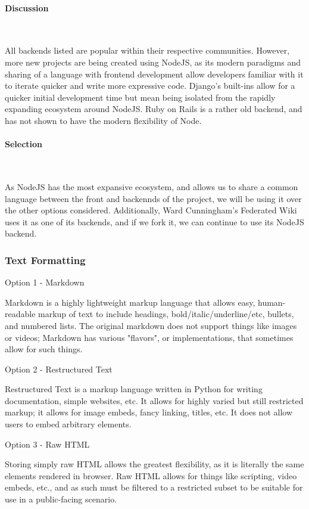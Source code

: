 \documentclass[letterpaper, 10pt, draftclsnofoot, compsoc, onecolumn]{IEEEtran}
\begin{document}
{\newpage
\paragraph{Discussion} ~\\
{\noindent
All backends listed are popular within their respective communities. However, more new projects are being created using NodeJS, as its modern paradigms and sharing of a language with frontend development allow developers familiar with it to iterate quicker and write more expressive code. Django's built-ins allow for a quicker initial development time but mean being isolated from the rapidly expanding ecosystem around NodeJS.
Ruby on Rails is a rather old backend, and has not shown to have the modern flexibility of Node.
 \par}

\medskip
\paragraph{Selection} ~\\
{\noindent As NodeJS has the most expansive ecosystem, and allows us to share a common language between the front and backennds of the project, we will be using it over the other options considered. Additionally, Ward Cunningham's Federated Wiki uses it as one of its backends, and if we fork it, we can continue to use its NodeJS backend. \par}

\newpage
\subsubsection{Text Formatting}
{\noindent \par}
{\noindent Option 1 - Markdown \par}
{\noindent Markdown is a highly lightweight markup language that allows easy, human-readable markup
of text to include headings, bold/italic/underline/etc, bullets, and numbered lists. The original markdown does not support
things like images or videos; Markdown has various "flavors", or implementations, that sometimes
allow for such things. \par}
{\noindent Option 2 - Restructured Text \par}
{\noindent Restructured Text is a markup language written in Python for writing documentation, simple websites,
etc. It allows for highly varied but still restricted markup; it allows for image embeds, fancy linking,
titles, etc. It does not allow users to embed arbitrary elements. \par}
{\noindent Option 3 - Raw HTML \par}
{\noindent Storing simply raw HTML allows the greatest flexibility, as it is literally the same elements
rendered in browser. Raw HTML allows for things like scripting, video embeds, etc., and as such must
be filtered to a restricted subset to be suitable for use in a public-facing scenario. \par}

}
\end{document}

